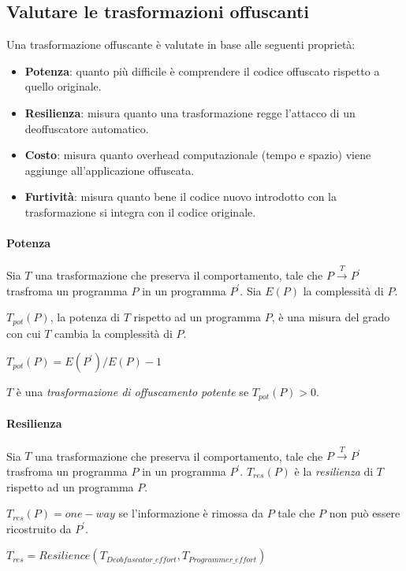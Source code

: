 \documentclass[a4paper,oneside,openright,titlepage,10pt,footinclude,headinclude]{scrbook}
\begin{document}
\subsection{Valutare le trasformazioni offuscanti}
Una trasformazione offuscante è valutate in base alle seguenti proprietà:
\begin{itemize}
\item
\textbf{Potenza}: quanto più difficile è comprendere il codice offuscato rispetto a quello originale.
\item
\textbf{Resilienza}: misura quanto una trasformazione regge l'attacco di un deoffuscatore automatico.
\item
\textbf{Costo}: misura quanto overhead computazionale (tempo e spazio) viene aggiunge all'applicazione offuscata.
\item
\textbf{Furtività}: misura quanto bene il codice nuovo introdotto con la trasformazione si integra con il codice originale.
\end{itemize}

\paragraph{Potenza} 
Sia $T$ una trasformazione che preserva il comportamento, tale che $P \xrightarrow{T} P^{'}$ trasfroma un programma $P$ in un programma $P^{'}$. Sia $E(P)$ la complessità di $P$.\smallskip


$T_{pot}(P)$, la potenza di $T$ rispetto ad un programma $P$, è una  misura del grado con cui $T$ cambia la complessità di $P$.

\begin{center}
$T_{pot}(P) = E(P^{'}) / E(P) - 1$
\end{center}
 
 $T$ è una \emph{trasformazione di offuscamento potente} se $T_{pot}(P) > 0$.
 
 \paragraph{Resilienza} 
Sia $T$ una trasformazione che preserva il comportamento, tale che $P \xrightarrow{T} P^{'}$ trasfroma un programma $P$ in un programma $P^{'}$.  $T_{res}(P)$ è la \emph{resilienza} di $T$ rispetto ad un programma $P$. \smallskip

 $T_{res}(P) = one-way$ se l'informazione è rimossa da $P$ tale che $P$ non può essere ricostruito da $P^{'}$. \smallskip

\begin{center}
$T_{res} = Resilience(T_{Deobfuscator\_effort}, T_{Programmer\_effort})$ 
\end{center}
\end{document}
